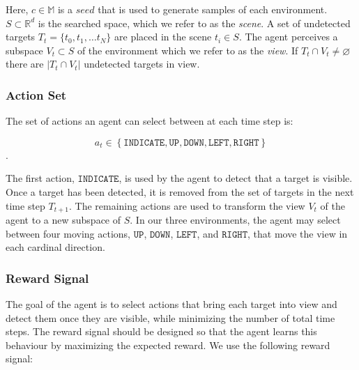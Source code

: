 Here, \(c \in \mathbb{M}\) is a \(seed\) that is used to generate samples of each environment.
\(S \subset \mathbb{R}^d\) is the searched space, which we refer to as the \textit{scene}.
A set of undetected targets \(T_t = \{t_0, t_1, \dots t_N\}\) are placed in the scene \(t_i \in S\).
The agent perceives a subspace \(V_t \subset S\) of the environment which we refer to as the \textit{view}.
If \(T_t \cap V_t \neq \varnothing\) there are \(\left\lvert T_t \cap V_t \right\rvert\) undetected targets in view.




\subsubsection{Action Set}

The set of actions an agent can select between at each time step is:

\begin{equation}
    a_t \in \left\lbrace \mathtt{INDICATE}, \mathtt{UP}, \mathtt{DOWN}, \mathtt{LEFT}, \mathtt{RIGHT} \right\rbrace
\end{equation}.

The first action, \(\mathtt{INDICATE}\), is used by the agent to detect that a target is visible.
Once a target has been detected, it is removed from the set of targets in the next time step \(T_{t+1}\).
The remaining actions are used to transform the view \(V_t\) of the agent to a new subspace of \(S\).
In our three environments, the agent may select between four moving actions, \(\mathtt{UP}\), \(\mathtt{DOWN}\), \(\mathtt{LEFT}\), and \(\mathtt{RIGHT}\), that move the view in each cardinal direction.

\subsubsection{Reward Signal}

The goal of the agent is to select actions that bring each target into view and detect them once they are visible, while minimizing the number of total time steps.
The reward signal should be designed so that the agent learns this behaviour by maximizing the expected reward.
We use the following reward signal:

